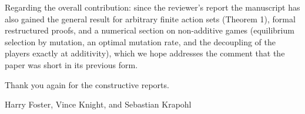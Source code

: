 \documentclass[11pt]{article}
\begin{document}
Regarding the overall contribution: since the reviewer's report the
manuscript has also gained the general result for arbitrary finite action
sets (Theorem 1), formal restructured proofs, and a numerical section on
non-additive games (equilibrium selection by mutation, an optimal mutation
rate, and the decoupling of the players exactly at additivity), which we
hope addresses the comment that the paper was short in its previous form.

\vspace{2em}

Thank you again for the constructive reports.

Harry Foster, Vince Knight, and Sebastian Krapohl
\end{document}
